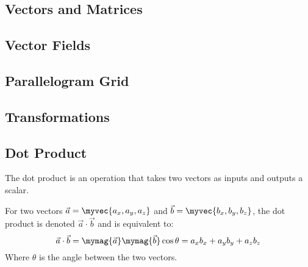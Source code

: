 \documentclass[11pt]{article}
\newenvironment{mybox}
{\begin{tcolorbox}[colback=red!5!white,colframe=red!75!black]}
{\end{tcolorbox}}
\begin{document}
\subsection{Vectors and Matrices}
\subsection{Vector Fields}
\subsection{Parallelogram Grid}
\subsection{Transformations}
\subsection{Dot Product}
The dot product is an operation that takes two vectors as inputs and outputs a scalar.
\begin{mybox}

    For two vectors $\vec{a}=\myvec{a_x,a_y,a_z}$ and $\vec{b}=\myvec{b_x,b_y,b_z}$, the dot product is denoted $\vec{a} \cdot \vec{b}$ and is equivalent to:
    \begin{equation*}
        \vec{a} \cdot \vec{b} = \mymag{\vec{a}}\mymag{\vec{b}}\cos{\theta} = a_xb_x+a_yb_y+a_zb_z
    \end{equation*}
    Where $\theta$ is the angle between the two vectors.
\end{mybox}
\end{document}
